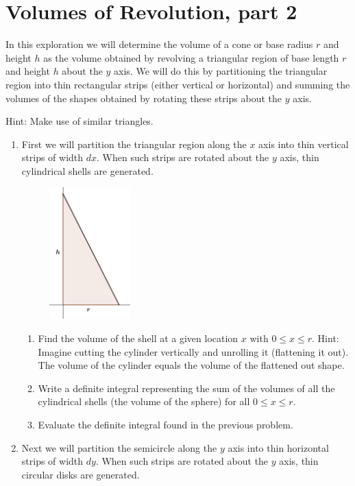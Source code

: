 \documentclass[12pt,letterpaper,fleqn]{article}
\begin{document}
\section*{Volumes of Revolution, part 2}
In this exploration we will determine the volume of a cone or base radius $r$ and height $h$ as the volume obtained by revolving a triangular region of base length $r$ and height $h$ about the $y$ axis. We will do this by partitioning the triangular region into thin rectangular strips (either vertical or horizontal) and summing the volumes of the shapes obtained by rotating these strips about the $y$ axis.

Hint: Make use of similar triangles.

\begin{enumerate}
 \item First we will partition the triangular region along the $x$ axis into thin vertical strips of width $dx$. When such strips are rotated about the $y$ axis, thin cylindrical shells are generated.
       \begin{figure}[!htb]
        \centering
        \includegraphics[height=2in]{img/triangular_region.png}
       \end{figure}
       \begin{enumerate}
        \item Find the volume of the shell at a given location $x$ with $0 \leq x \leq r$. Hint: Imagine cutting the cylinder vertically and unrolling it (flattening it out). The volume of the cylinder equals the volume of the flattened out shape.
        \item Write a definite integral representing the sum of the volumes of all the cylindrical shells (the volume of the sphere) for all $0 \leq x \leq r$.
        \item Evaluate the definite integral found in the previous problem.
       \end{enumerate}
       \newpage
 \item Next we will partition the semicircle along the $y$ axis into thin horizontal strips of width $dy$. When such strips are rotated about the $y$ axis, thin circular disks are generated.

\end{enumerate}
\end{document}
